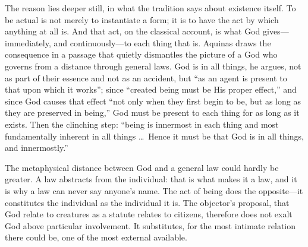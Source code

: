 The reason lies deeper still, in what the tradition says about existence itself. To be actual is not merely to instantiate a form; it is to have the act by which anything at all is. And that act, on the classical account, is what God gives---immediately, and continuously---to each thing that is. Aquinas draws the consequence in a passage that quietly dismantles the picture of a God who governs from a distance through general laws. God is in all things, he argues, not as part of their essence and not as an accident, but ``as an agent is present to that upon which it works''; since ``created being must be His proper effect,'' and since God causes that effect ``not only when they first begin to be, but as long as they are preserved in being,'' God must be present to each thing for as long as it exists. Then the clinching step: ``being is innermost in each thing and most fundamentally inherent in all things \ldots\ Hence it must be that God is in all things, and innermostly.''

The metaphysical distance between God and a general law could hardly be greater. A law abstracts from the individual: that is what makes it a law, and it is why a law can never say anyone's name. The act of being does the opposite---it constitutes the individual as the individual it is. The objector's proposal, that God relate to creatures as a statute relates to citizens, therefore does not exalt God above particular involvement. It substitutes, for the most intimate relation there could be, one of the most external available.

